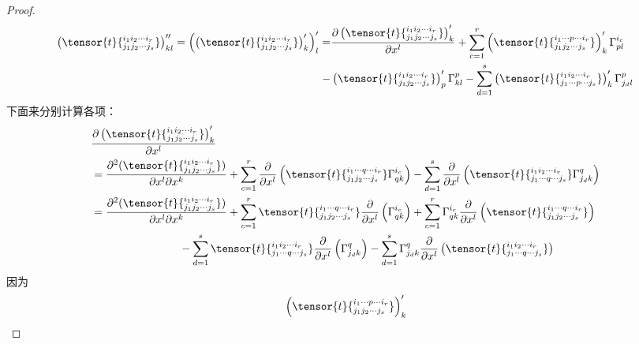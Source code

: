 \begin{proof}
\[
\begin{split}
\left( \tensor{t}{^{i_{1}i_{2}\cdots i_{r}}_{j_{1}j_{2}\cdots j_{s}}} \right)^{\prime\prime}_{kl}=\left( \left( \tensor{t}{^{i_{1}i_{2}\cdots i_{r}}_{j_{1}j_{2}\cdots j_{s}}} \right)^{\prime}_{k} \right)^{\prime}_{l}=&\frac{{\partial}\left( \tensor{t}{^{i_{1}i_{2}\cdots i_{r}}_{j_{1}j_{2}\cdots j_{s}}} \right)^{\prime}_{k} }{\partial x^{l}}+\sum_{c=1}^{r}\left( \tensor{t}{^{i_{1}\cdots p\cdots i_{r}}_{j_{1}j_{2}\cdots j_{s}}} \right)^{\prime}_{k} \Gamma_{pl}^{i_{c}}\\
-&\left( \tensor{t}{^{i_{1}i_{2}\cdots i_{r}}_{j_{1}j_{2}\cdots j_{s}}} \right)^{\prime}_{p}\Gamma_{kl}^{p}-\sum_{d=1}^{s}\left( \tensor{t}{^{i_{1}i_{2}\cdots i_{r}}_{j_{1}\cdots p\cdots  j_{s}}} \right)^{\prime}_{k} \Gamma_{j_{d}l}^{p}
\end{split}
\]
下面来分别计算各项：
\[
\begin{split}
&\frac{\partial \left( \tensor{t}{^{i_{1}i_{2}\cdots i_{r}}_{j_{1}j_{2}\cdots j_{s}}} \right)^{\prime}_{k} }{\partial x^{l}}\\
&=\frac{{\partial}^{2}(\tensor{t}{^{i_{1}i_{2}\cdots i_{r}}_{j_{1}j_{2}\cdots j_{s}}})}{\partial x^{l}\partial x^{k}}+\sum_{c=1}^{r}\frac{\partial  }{\partial x^{l}}\left( \tensor{t}{^{i_{1}\cdots q\cdots i_{r}}_{j_{1}j_{2}\cdots j_{s}}}\Gamma_{qk}^{i_{c}} \right)-\sum_{d=1}^{s}\frac{\partial  }{\partial x^{l}}\left( \tensor{t}{^{i_{1}i_{2}\cdots i_{r}}_{j_{1}\cdots q\cdots j_{s}}}\Gamma_{j_{d}k}^{q} \right)\\
&=\frac{{\partial}^{2}(\tensor{t}{^{i_{1}i_{2}\cdots i_{r}}_{j_{1}j_{2}\cdots j_{s}}})}{\partial x^{l}\partial x^{k}}+\sum_{c=1}^{r}\tensor{t}{^{i_{1}\cdots q\cdots i_{r}}_{j_{1}j_{2}\cdots j_{s}}}\frac{\partial  }{\partial x^{l}} \left( \Gamma_{qk}^{i_{c}} \right) +\sum_{c=1}^{r}\Gamma_{qk}^{i_{c}}\frac{\partial  }{\partial x^{l}}\left( \tensor{t}{^{i_{1}\cdots q\cdots i_{r}}_{j_{1}j_{2}\cdots j_{s}}} \right)\\
& \quad\quad\quad\quad\quad\quad\quad\quad-\sum_{d=1}^{s} \tensor{t}{^{i_{1}i_{2}\cdots i_{r}}_{j_{1}\cdots q\cdots j_{s}}}\frac{\partial  }{\partial x^{l}}\left(\Gamma_{j_{d}k}^{q} \right)-\sum_{d=1}^{s}\Gamma_{j_{d}k}^{q}  \frac{\partial  }{\partial x^{l}}\left(\tensor{t}{^{i_{1}i_{2}\cdots i_{r}}_{j_{1}\cdots q\cdots j_{s}}}\right)\\
\end{split}
\]
因为
\[
\begin{split}
	&\left( \tensor{t}{^{i_{1}\cdots p\cdots i_{r}}_{j_{1}j_{2}\cdots j_{s}}} \right)^{\prime}_{k}\\

\end{split}\]
\end{proof}
